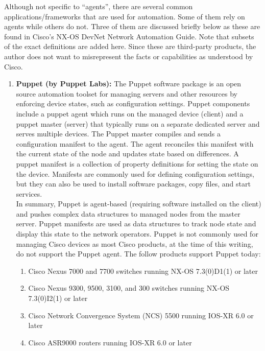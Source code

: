Although not specific to ``agents'', there are several common
applications/frameworks that are used for automation. Some of them rely on
agents while others do not. Three of them are discussed briefly below as these
are found in Cisco’s NX-OS DevNet Network Automation Guide. Note that subsets
of the exact definitions are added here. Since these are third-party products,
the author does not want to misrepresent the facts or capabilities as
understood by Cisco.

\begin{enumerate}
  \item \textbf{Puppet (by Puppet Labs):} The Puppet software package is an
  open source automation toolset for managing servers and other resources by
  enforcing device states, such as configuration settings. Puppet components
  include a puppet agent which runs on the managed device (client) and a
  puppet master (server) that typically runs on a separate dedicated server
  and serves multiple devices. The Puppet master compiles and sends a
  configuration manifest to the agent. The agent reconciles this manifest with
  the current state of the node and updates state based on differences. A
  puppet manifest is a collection of property definitions for setting the
  state on the device. Manifests are commonly used for defining configuration
  settings, but they can also be used to install software packages, copy
  files, and start services. \\
  
  In summary, Puppet is agent-based (requiring software installed on the
  client) and pushes complex data structures to managed nodes from the master
  server. Puppet manifests are used as data structures to track node state and
  display this state to the network operators. Puppet is not commonly used for
  managing Cisco devices as most Cisco products, at the time of this writing,
  do not support the Puppet agent. The follow products support Puppet today:

  \begin{enumerate}
    \item Cisco Nexus 7000 and 7700 switches running NX-OS 7.3(0)D1(1) or later
    \item Cisco Nexus 9300, 9500, 3100, and 300 switches running NX-OS
 	7.3(0)I2(1) or later
    \item Cisco Network Convergence System (NCS) 5500 running IOS-XR 6.0 or later
    \item Cisco ASR9000 routers running IOS-XR 6.0 or later
  \end{enumerate}


\end{enumerate}
